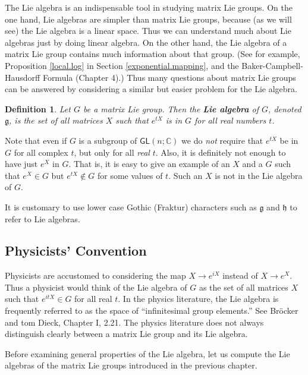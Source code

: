 \documentclass{amsbook}
\let \frak = \mathfrak
\theoremstyle{plain}
\newtheorem{definition}[theorem]{Definition}
\numberwithin{equation}{chapter}
\numberwithin{theorem}{chapter}
\begin{document}
The Lie algebra is an indispensable tool in studying matrix Lie groups. On the
one hand, Lie algebras are simpler than matrix Lie groups, because (as we will
see) the Lie algebra is a linear space. Thus we can understand much about Lie
algebras just by doing linear algebra. On the other hand, the Lie algebra of a
matrix Lie group contains much information about that group. (See for example,
Proposition \ref{local.log} in Section \ref{exponential.mapping}, and the
Baker-Campbell-Hausdorff Formula (Chapter 4).) Thus many questions about
matrix Lie groups can be answered by considering a similar but easier problem
for the Lie algebra.

\begin{definition}
Let $G$ be a matrix Lie group. Then the \textbf{Lie algebra} of $G$, denoted
$\frak{g}$, is the set of all matrices $X$ such that $e^{tX}$ is in $G$ for
all real numbers $t$.
\end{definition}

Note that even if $G$ is a subgroup of $\mathsf{GL}(n;\mathbb{C})$ we do
\textit{not} require that $e^{tX}$ be in $G$ for all complex $t$, but only for
all \textit{real} $t$. Also, it is definitely not enough to have just $e^{X}$
in $G$. That is, it is easy to give an example of an $X$ and a $G$ such that
$e^{X}\in G$ but $e^{tX}\notin G$ for some values of $t$. Such an $X$ is not
in the Lie algebra of $G$.

It is customary to use lower case Gothic (Fraktur) characters such as
$\frak{g}$ and $\frak{h}$ to refer to Lie algebras.

\subsection{Physicists' Convention}

Physicists are accustomed to considering the map $X\rightarrow e^{iX}$ instead
of $X\rightarrow e^{X}$. Thus a physicist would think of the Lie algebra of
$G$ as the set of all matrices $X$ such that $e^{itX}\in G$ for all real $t$.
In the physics literature, the Lie algebra is frequently referred to as the
space of ``infinitesimal group elements.'' See Br\"{o}cker and tom Dieck,
Chapter I, 2.21. The physics literature does not always distinguish clearly
between a matrix Lie group and its Lie algebra.

Before examining general properties of the Lie algebra, let us compute the Lie
algebras of the matrix Lie groups introduced in the previous chapter.
\end{document}
